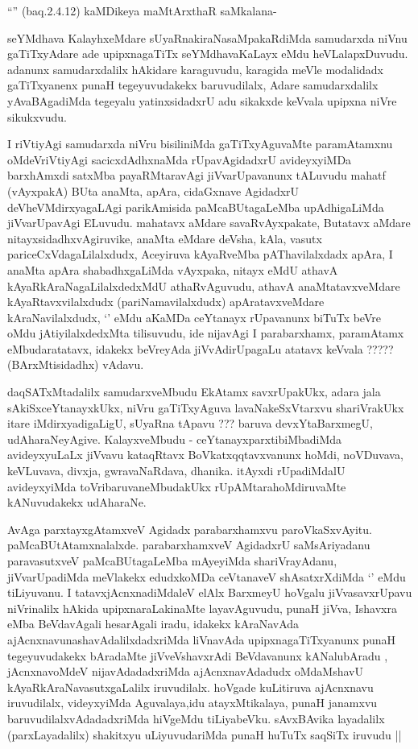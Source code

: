 \begin{artha}
``\stext'' (baq.2.4.12) kaMDikeya maMtArxthaR saMkalana-
\end{artha}

\begin{artha}
 seYMdhava KalayhxeMdare sUyaRnakiraNasaMpakaRdiMda samudarxda niVnu
 gaTiTxyAdare ade upipxnagaTiTx seYMdhavaKaLayx eMdu
 heVLalapxDuvudu. adanunx samudarxdalilx hAkidare karaguvudu, karagida
 meVle modalidadx gaTiTxyanenx punaH tegeyuvudakekx baruvudilalx,
 Adare samudarxdalilx yAvaBAgadiMda tegeyalu yatinxsidadxrU adu
 sikakxde keVvala upipxna niVre sikukxvudu.

I riVtiyAgi samudarxda niVru bisiliniMda gaTiTxyAguvaMte  paramAtamxnu
oMdeVriVtiyAgi sacicxdAdhxnaMda rUpavAgidadxrU avideyxyiMDa barxhAmxdi
satxMba payaRMtaravAgi jiVvarUpavanunx tALuvudu mahatf (vAyxpakA) BUta
anaMta, apAra, cidaGxnave AgidadxrU deVheVMdirxyagaLAgi parikAmisida
paMcaBUtagaLeMba upAdhigaLiMda jiVvarUpavAgi ELuvudu. mahatavx aMdare
savaRvAyxpakate, Butatavx aMdare nitayxsidadhxvAgiruvike, anaMta
eMdare deVsha, kAla, vasutx pariceCxVdagaLilalxdudx, Aceyiruva
kAyaRveMba pAThavilalxdadx apAra, I anaMta apAra shabadhxgaLiMda
vAyxpaka, nitayx eMdU athavA kAyaRkAraNagaLilalxdedxMdU athaRvAguvudu,
athavA anaMtatavxveMdare kAyaRtavxvilalxdudx (pariNamavilalxdudx)
apAratavxveMdare kAraNavilalxdudx, `\stext' eMdu aKaMDa ceYtanayx
rUpavanunx biTuTx beVre oMdu jAtiyilalxdedxMta tilisuvudu, ide
nijavAgi I parabarxhamx, paramAtamx eMbudaratatavx, idakekx beVreyAda
jiVvAdirUpagaLu atatavx keVvala ????? (BArxMtisidadhx) vAdavu. 

daqSATxMtadalilx samudarxveMbudu EkAtamx savxrUpakUkx, adara jala
sAkiSxceYtanayxkUkx, niVru gaTiTxyAguva lavaNakeSxVtarxvu shariVrakUkx
itare iMdirxyadigaLigU, sUyaRna tApavu ??? baruva devxYtaBarxmegU,
udAharaNeyAgive. KalayxveMbudu - ceYtanayxparxtibiMbadiMda avideyxyuLaLx
jiVvavu kataqRtavx BoVkatxqqtavxvanunx hoMdi, noVDuvava, keVLuvava,
divxja, gwravaNaRdava, dhanika. itAyxdi rUpadiMdalU avideyxyiMda
toVribaruvaneMbudakUkx rUpAMtarahoMdiruvaMte kANuvudakekx udAharaNe.


AvAga parxtayxgAtamxveV Agidadx parabarxhamxvu
paroVkaSxvAyitu. paMcaBUtAtamxnalalxde. parabarxhamxveV AgidadxrU
saMsAriyadanu paravasutxveV paMcaBUtagaLeMba mAyeyiMda shariVrayAdanu,
jiVvarUpadiMda meVlakekx edudxkoMDa ceVtanaveV shAsatxrXdiMda `\stext'
eMdu tiLiyuvanu. I tatavxjAcnxnadiMdaleV elAlx BarxmeyU hoVgalu
jiVvasavxrUpavu niVrinalilx hAkida upipxnaraLakinaMte layavAguvudu,
punaH jiVva, Ishavxra eMba BeVdavAgali hesarAgali iradu, idakekx
kAraNavAda ajAcnxnavunashavAdalilxdadxriMda liVnavAda
upipxnagaTiTxyanunx punaH tegeyuvudakekx bAradaMte jiVveVshavxrAdi
BeVdavanunx kANalubAradu , jAcnxnavoMdeV nijavAdadadxriMda
ajAcnxnavAdadudx oMdaMshavU kAyaRkAraNavasutxgaLalilx
iruvudilalx. hoVgade kuLitiruva ajAcnxnavu iruvudilalx, videyxyiMda
Aguvalaya,idu atayxMtikalaya, punaH janamxvu baruvudilalxvAdadadxriMda
hiVgeMdu tiLiyabeVku. sAvxBAvika layadalilx (parxLayadalilx) shakitxyu
uLiyuvudariMda punaH huTuTx saqSiTx iruvudu ||

\end{artha}
